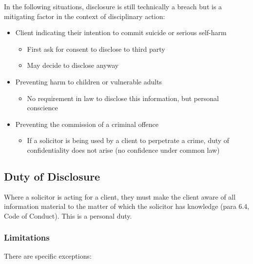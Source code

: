 \documentclass[
]{article}
\providecommand{\tightlist}{%
  \setlength{\itemsep}{0pt}\setlength{\parskip}{0pt}}
\begin{document}
In the following situations, disclosure is still technically a breach
but is a mitigating factor in the context of disciplinary action:

\begin{itemize}
\tightlist
\item
  Client indicating their intention to commit suicide or serious
  self-harm

  \begin{itemize}
  \tightlist
  \item
    First ask for consent to disclose to third party
  \item
    May decide to disclose anyway
  \end{itemize}
\item
  Preventing harm to children or vulnerable adults

  \begin{itemize}
  \tightlist
  \item
    No requirement in law to disclose this information, but personal
    conscience
  \end{itemize}
\item
  Preventing the commission of a criminal offence

  \begin{itemize}
  \tightlist
  \item
    If a solicitor is being used by a client to perpetrate a crime, duty
    of confidentiality does not arise (no confidence under common law)
  \end{itemize}
\end{itemize}

\hypertarget{duty-of-disclosure}{%
\subsection{Duty of Disclosure}\label{duty-of-disclosure}}

Where a solicitor is acting for a client, they must make the client
aware of all information material to the matter of which the solicitor
has knowledge (para 6.4, Code of Conduct). This is a personal duty.

\hypertarget{limitations}{%
\subsubsection{Limitations}\label{limitations}}

There are specific exceptions:
\end{document}
